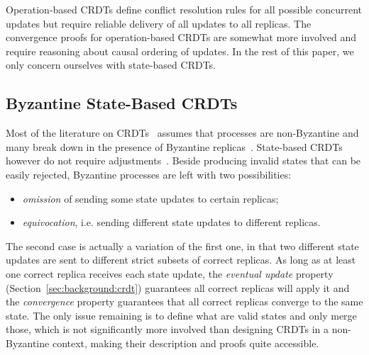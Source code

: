 \documentclass[9pt, oneside]{article}   	%
\begin{document}
Operation-based CRDTs define conflict resolution rules for all possible concurrent updates but require reliable delivery of all updates to all replicas. The convergence proofs for operation-based CRDTs are somewhat more involved and require reasoning about causal ordering of updates. In the rest of this paper, we only concern ourselves with state-based CRDTs.

\subsection{Byzantine State-Based CRDTs}
\label{sec:background:byzantine-state-crdt}

Most of the literature on CRDTs~\cite{crdt-website} assumes that processes are non-Byzantine and many break down in the presence of Byzantine replicas~\cite{Kleppmann2022byzantine}. State-based CRDTs however do not require adjustments~\cite{jacob2022bft-crdt}. Beside producing invalid states that can be easily rejected, Byzantine processes are left with two possibilities:
\begin{itemize}
	\item \textit{omission} of sending some state updates to certain replicas;
	\item \textit{equivocation}, i.e. sending different state updates to different replicas.
\end{itemize}

The second case is actually a variation of the first one, in that two different state updates are sent to different strict subsets of correct replicas. As long as at least one correct replica receives each state update, the \textit{eventual update} property (Section~\ref{sec:background:crdt}) guarantees all correct replicas will apply it and the \textit{convergence} property guarantees that all correct replicas converge to the same state. The only issue remaining is to define what are valid states and only merge those, which is not significantly more involved than designing CRDTs in a non-Byzantine context, making their description and proofs quite accessible.
\end{document}
